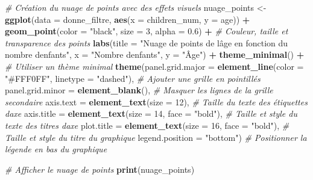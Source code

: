 \documentclass[
]{article}
\newenvironment{Shaded}{\begin{snugshade}}{\end{snugshade}}
\newcommand{\AttributeTok}[1]{\textcolor[rgb]{0.13,0.29,0.53}{#1}}
\newcommand{\CommentTok}[1]{\textcolor[rgb]{0.56,0.35,0.01}{\textit{#1}}}
\newcommand{\DecValTok}[1]{\textcolor[rgb]{0.00,0.00,0.81}{#1}}
\newcommand{\FloatTok}[1]{\textcolor[rgb]{0.00,0.00,0.81}{#1}}
\newcommand{\FunctionTok}[1]{\textcolor[rgb]{0.13,0.29,0.53}{\textbf{#1}}}
\newcommand{\NormalTok}[1]{#1}
\newcommand{\OtherTok}[1]{\textcolor[rgb]{0.56,0.35,0.01}{#1}}
\newcommand{\SpecialCharTok}[1]{\textcolor[rgb]{0.81,0.36,0.00}{\textbf{#1}}}
\newcommand{\StringTok}[1]{\textcolor[rgb]{0.31,0.60,0.02}{#1}}
\begin{document}
\begin{Shaded}
\begin{Highlighting}[]
\CommentTok{\# Création du nuage de points avec des effets visuels}
\NormalTok{nuage\_points }\OtherTok{\textless{}{-}} \FunctionTok{ggplot}\NormalTok{(}\AttributeTok{data =}\NormalTok{ donne\_filtre, }\FunctionTok{aes}\NormalTok{(}\AttributeTok{x =}\NormalTok{ children\_num, }\AttributeTok{y =}\NormalTok{ age)) }\SpecialCharTok{+}
  \FunctionTok{geom\_point}\NormalTok{(}\AttributeTok{color =} \StringTok{"black"}\NormalTok{, }\AttributeTok{size =} \DecValTok{3}\NormalTok{, }\AttributeTok{alpha =} \FloatTok{0.6}\NormalTok{) }\SpecialCharTok{+}  \CommentTok{\# Couleur, taille et transparence des points}
  \FunctionTok{labs}\NormalTok{(}\AttributeTok{title =} \StringTok{"Nuage de points de l\textquotesingle{}âge en fonction du nombre d\textquotesingle{}enfants"}\NormalTok{,}
       \AttributeTok{x =} \StringTok{"Nombre d\textquotesingle{}enfants"}\NormalTok{,}
       \AttributeTok{y =} \StringTok{"Âge"}\NormalTok{) }\SpecialCharTok{+}
  \FunctionTok{theme\_minimal}\NormalTok{() }\SpecialCharTok{+}  \CommentTok{\# Utiliser un thème minimal}
  \FunctionTok{theme}\NormalTok{(}\AttributeTok{panel.grid.major =} \FunctionTok{element\_line}\NormalTok{(}\AttributeTok{color =} \StringTok{"\#FFF0FF"}\NormalTok{, }\AttributeTok{linetype =} \StringTok{"dashed"}\NormalTok{),  }\CommentTok{\# Ajouter une grille en pointillés}
        \AttributeTok{panel.grid.minor =} \FunctionTok{element\_blank}\NormalTok{(),  }\CommentTok{\# Masquer les lignes de la grille secondaire}
        \AttributeTok{axis.text =} \FunctionTok{element\_text}\NormalTok{(}\AttributeTok{size =} \DecValTok{12}\NormalTok{),  }\CommentTok{\# Taille du texte des étiquettes d\textquotesingle{}axe}
        \AttributeTok{axis.title =} \FunctionTok{element\_text}\NormalTok{(}\AttributeTok{size =} \DecValTok{14}\NormalTok{, }\AttributeTok{face =} \StringTok{"bold"}\NormalTok{),  }\CommentTok{\# Taille et style du texte des titres d\textquotesingle{}axe}
        \AttributeTok{plot.title =} \FunctionTok{element\_text}\NormalTok{(}\AttributeTok{size =} \DecValTok{16}\NormalTok{, }\AttributeTok{face =} \StringTok{"bold"}\NormalTok{),  }\CommentTok{\# Taille et style du titre du graphique}
        \AttributeTok{legend.position =} \StringTok{"bottom"}\NormalTok{)  }\CommentTok{\# Positionner la légende en bas du graphique}

\CommentTok{\# Afficher le nuage de points }
\FunctionTok{print}\NormalTok{(nuage\_points)}
\end{Highlighting}
\end{Shaded}
\end{document}
